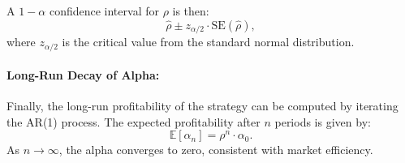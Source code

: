 A $1 - \alpha$ confidence interval for $\rho$ is then:
\[
\hat{\rho} \pm z_{\alpha/2} \cdot \text{SE}(\hat{\rho}),
\]
where $z_{\alpha/2}$ is the critical value from the standard normal distribution.

\paragraph{Long-Run Decay of Alpha:}

Finally, the long-run profitability of the strategy can be computed by iterating the AR(1) process. The expected profitability after $n$ periods is given by:
\[
\mathbb{E}[\alpha_n] = \rho^n \cdot \alpha_0.
\]
As $n \to \infty$, the alpha converges to zero, consistent with market efficiency.

